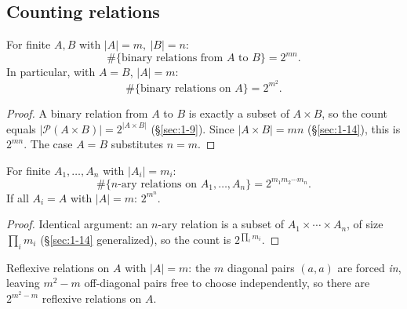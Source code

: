 \subsection{Counting relations}
\label{sec:2-18}

\begin{theorem}
For finite $A,B$ with $|A|=m,\ |B|=n$:
\[
\#\{\text{binary relations from } A \text{ to } B\} = 2^{mn}.
\]
In particular, with $A=B$, $|A|=m$:
\[
\#\{\text{binary relations on } A\} = 2^{m^2}.
\]
\end{theorem}
\begin{proof}
A binary relation from $A$ to $B$ is exactly a subset of $A \times B$, so the count equals $|\mathcal{P}(A\times B)| = 2^{|A\times B|}$ (\S\ref{sec:1-9}). Since $|A\times B| = mn$ (\S\ref{sec:1-14}), this is $2^{mn}$. The case $A=B$ substitutes $n=m$.
\end{proof}

\begin{corollary}
For finite $A_1,\dots,A_n$ with $|A_i|=m_i$:
\[
\#\{n\text{-ary relations on } A_1,\dots,A_n\} = 2^{m_1 m_2 \cdots m_n}.
\]
If all $A_i = A$ with $|A|=m$: $2^{m^n}$.
\end{corollary}
\begin{proof}
Identical argument: an $n$-ary relation is a subset of $A_1\times\cdots\times A_n$, of size $\prod_i m_i$ (\S\ref{sec:1-14} generalized), so the count is $2^{\prod_i m_i}$.
\end{proof}

\begin{example}
Reflexive relations on $A$ with $|A|=m$: the $m$ diagonal pairs $(a,a)$ are forced \emph{in}, leaving $m^2 - m$ off-diagonal pairs free to choose independently, so there are $2^{m^2-m}$ reflexive relations on $A$.
\end{example}

